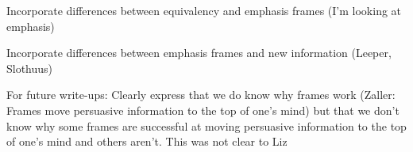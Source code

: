 \begin{coi}
\begin{coi}
				\item Incorporate differences between equivalency and emphasis frames (I'm looking at emphasis)
				\item Incorporate differences between emphasis frames and new information (Leeper, Slothuus)
			\end{coi}
		\item For future write-ups: Clearly express that we do know why frames work (Zaller: Frames move persuasive information to the top of one's mind) but that we don't know why some frames are successful at moving persuasive information to the top of one's mind and others aren't. This was not clear to Liz
	\end{coi}















